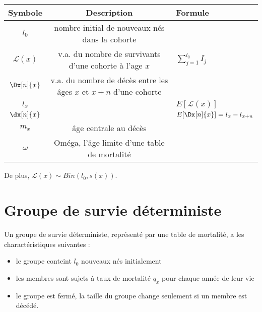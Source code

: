 \begin{center}
	\begin{tabular}{ccl}
		\hline
		    Symbole      &                             Description                             & Formule                                \\ \hline
		     $l_0$       &           nombre initial de nouveaux nés dans la cohorte            &                                        \\
		$\mathcal{L}(x)$ &       v.a. du nombre de survivants d'une cohorte à l'age $x$        & $\displaystyle \sum_{j = 1}^{l_0} I_j$ \\
		  $\Dx[n]{x}$    & v.a. du nombre de décès entre les âges $x$ et $x + n$ d'une cohorte &                                        \\
		     $l_x$       &                                                                     & $E[\mathcal{L}(x)]$                    \\
		  $\dx[n]{x}$    &                                                                     & $E[\Dx[n]{x}] = l_x - l_{x + n}$       \\
		     $m_x$       &                        âge centrale au décès                        &                                        \\
		    $\omega$     &            Oméga, l'âge limite d'une table de mortalité             &                                        \\ \hline
	\end{tabular}
\end{center}

De plus, $\mathcal{L}(x)\sim Bin(l_0, s(x))$. 


\section{Groupe de survie déterministe}

\begin{definition}{}{}
	Un groupe de survie déterministe, représenté par une table de mortalité, a les charactéristiques suivantes : 
	\begin{itemize}
		\item le groupe conteint $l_0$ nouveaux nés initialement
		\item les membres sont sujets à taux de mortalité $q_x$ pour chaque année de leur vie
		\item le groupe est fermé, la taille du groupe change seulement si un membre est décédé. 
	\end{itemize}
\end{definition}

